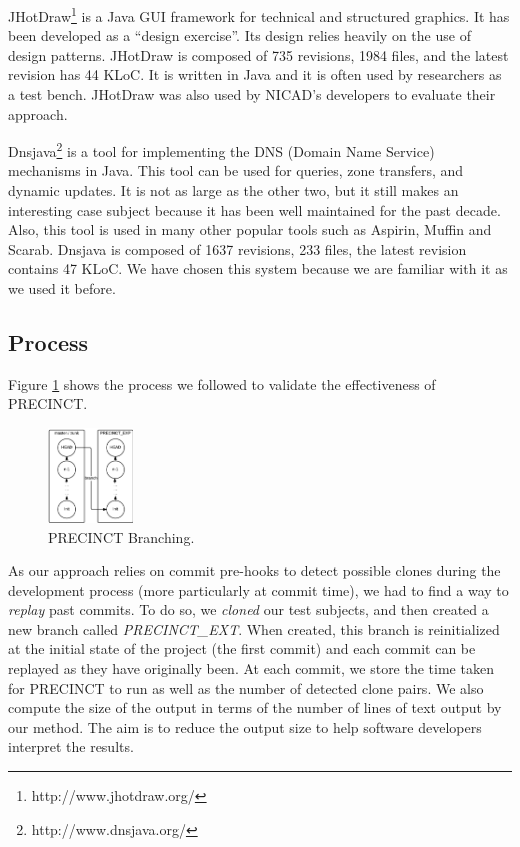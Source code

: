 \documentclass[conference]{IEEEtran}
\begin{document}
JHotDraw\footnote{http://www.jhotdraw.org/} is a Java GUI framework for technical and structured graphics.
It has been developed as a ``design exercise''. Its design relies heavily on the use of design patterns. JHotDraw is composed of 735 revisions, 1984 files, and the latest revision has 44 KLoC. It is written in Java and it is often used by researchers as a test bench. JHotDraw was also used by NICAD's developers to evaluate their approach.

Dnsjava\footnote{http://www.dnsjava.org/} is a tool for implementing the DNS (Domain Name Service) mechanisms in Java.
This tool can be used for queries, zone transfers, and dynamic updates.
It is not as large as the other two, but it still makes an interesting case subject because it has been well maintained for the past decade. Also, this tool is used in many other popular tools such as Aspirin, Muffin and
Scarab. Dnsjava is composed of 1637 revisions, 233 files, the latest revision contains 47 KLoC.
We have chosen this system because we are familiar with it as we used it before\cite{Nayrolles2015c}.

\subsection{Process}
\label{sub:Process}


Figure \ref{fig:precinct-branching} shows the process we followed to validate the effectiveness of PRECINCT.

\begin{figure}
  \centering
    \includegraphics[width=0.2\textwidth]{media/branch.png}
    \caption{PRECINCT Branching.\label{fig:precinct-branching}}
\end{figure}

As our approach relies on commit pre-hooks to detect possible clones during the development process (more particularly at commit time), we had to find a way to \textit{replay} past commits. To do so, we  \textit{cloned} our test subjects, and then created a new branch called \textit{PRECINCT\_EXT}.
When created, this branch is reinitialized at the initial state of the project (the first commit) and each commit can be replayed as they have originally been. At each commit, we store the time taken for PRECINCT to run as well as the number of detected clone pairs. We also compute the size of the output in terms of the number of lines of text output by our method. The aim is to reduce the output size to help software developers interpret the results.
\end{document}
